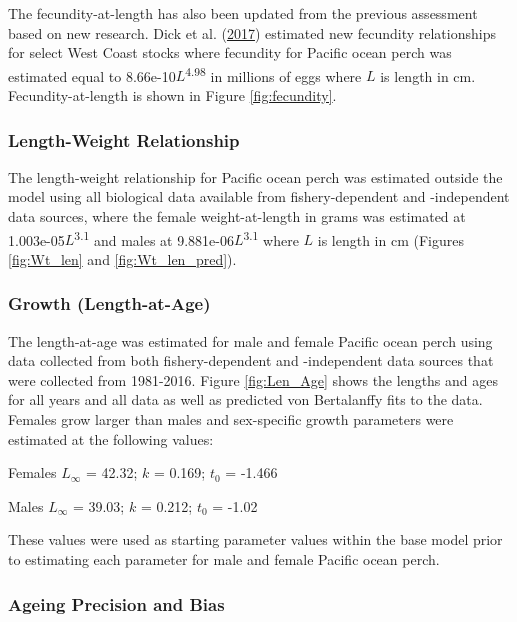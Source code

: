 \documentclass[12pt,]{article}
\begin{document}
The fecundity-at-length has also been updated from the previous
assessment based on new research. Dick et al.
(\protect\hyperlink{ref-dick_meta-analysis_2017}{2017}) estimated new
fecundity relationships for select West Coast stocks where fecundity for
Pacific ocean perch was estimated equal to
8.66e-10\(L\)\textsuperscript{4.98} in millions of eggs where \(L\) is
length in cm. Fecundity-at-length is shown in Figure
\ref{fig:fecundity}.

\subsubsection{Length-Weight
Relationship}\label{length-weight-relationship}

The length-weight relationship for Pacific ocean perch was estimated
outside the model using all biological data available from
fishery-dependent and -independent data sources, where the female
weight-at-length in grams was estimated at
1.003e-05\(L\)\textsuperscript{3.1} and males at
9.881e-06\(L\)\textsuperscript{3.1} where \(L\) is length in cm (Figures
\ref{fig:Wt_len} and \ref{fig:Wt_len_pred}).

\subsubsection{Growth (Length-at-Age)}\label{growth-length-at-age}

The length-at-age was estimated for male and female Pacific ocean perch
using data collected from both fishery-dependent and -independent data
sources that were collected from 1981-2016. Figure \ref{fig:Len_Age}
shows the lengths and ages for all years and all data as well as
predicted von Bertalanffy fits to the data. Females grow larger than
males and sex-specific growth parameters were estimated at the following
values:

\begin{centering}

Females $L_{\infty}$ = 42.32; $k$ = 0.169; $t_0$ = -1.466

Males $L_{\infty}$ = 39.03; $k$ = 0.212; $t_0$ = -1.02

\end{centering}

These values were used as starting parameter values within the base
model prior to estimating each parameter for male and female Pacific
ocean perch.

\subsubsection{Ageing Precision and
Bias}\label{ageing-precision-and-bias}
\end{document}
